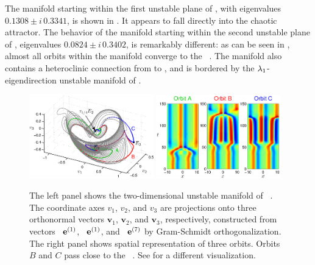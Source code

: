 The manifold starting within the first unstable plane of , with
eigenvalues $0.1308\pm i\,0.3341$, is shown in
. It appears to fall directly into the
chaotic attractor.  The behavior of the manifold starting within
the second unstable plane of , eigenvalues $0.0824\pm i \, 0.3402$, is
remarkably different: as can be seen in ,
almost all orbits within the manifold converge to the \eqv\ .  The
manifold also contains a heteroclinic connection from  to ,
and is bordered by the $\eigExp[1]$-eigendirection
unstable manifold of .

\begin{figure}[ht]
\begin{center}
\includegraphics[width=0.48\textwidth, clip=true]{figs/ks22_E2_manifold_c.eps}
\includegraphics[width=0.48\textwidth, clip=true]{figs/ks22_E2_orbits_c.eps}
\end{center}
\caption{
The left panel shows the two-dimensional
unstable manifold of \eqv\ . The coordinate axes
$v_1$, $v_2$, and $v_3$ are
projections onto three orthonormal vectors
$\mathbf{v}_1$, $\mathbf{v}_2$, and $\mathbf{v}_3$,
respectively, constructed from vectors
\Re\, $\jEigvec{1}$, \Im\, $\jEigvec{1}$, and \Re\, $\jEigvec{7}$
by Gram-Schmidt orthogonalization.
The right panel shows spatial representation of three orbits. Orbits
$B$ and $C$ pass close to the \eqv\ . See
 for a different visualization.
       }
\label{f:KS22E2man}
\end{figure}


